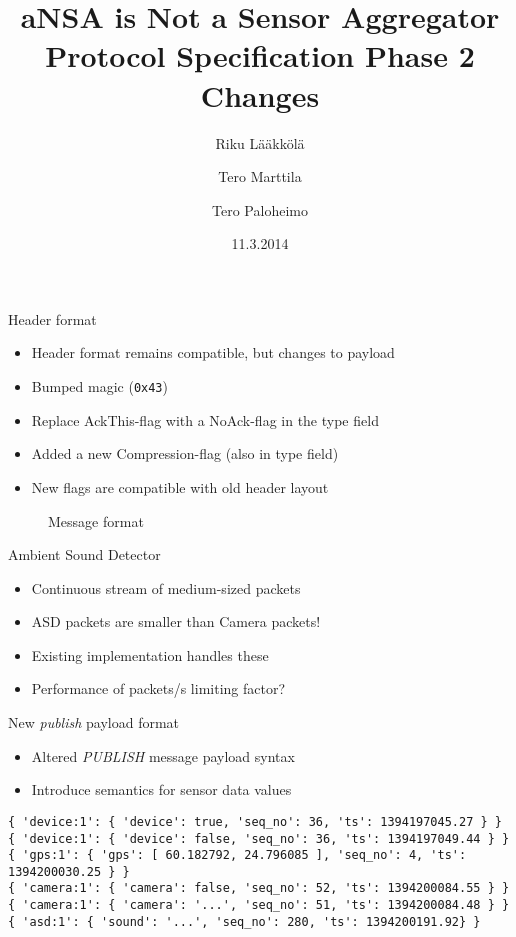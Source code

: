\documentclass{beamer}
\title[SFO protocol]{aNSA is Not a Sensor Aggregator\\Protocol Specification Phase 2 Changes}
\author{Riku Lääkkölä \and Tero Marttila \and Tero Paloheimo}
\institute{Aalto ELEC}
\date{11.3.2014}
\begin{document}
\begin{frame}
\titlepage
\end{frame}

\begin{frame}{Header format}
\begin{itemize}
	\item Header format remains compatible, but changes to payload
	\item Bumped magic (\texttt{0x43})
	\item Replace AckThis-flag with a NoAck-flag in the type field
	\item Added a new Compression-flag (also in type field)
	\item New flags are compatible with old header layout
\end{itemize}

\begin{figure}
    \begin{center}
        {\tiny }
        \caption{Message format}
        \label{fig:header}
    \end{center}
\end{figure}

\end{frame}

\begin{frame}{Ambient Sound Detector}
\begin{itemize}
	\item Continuous stream of medium-sized packets
	\item ASD packets are smaller than Camera packets!
	\item Existing implementation handles these
	\item Performance of packets/s limiting factor?
\end{itemize}
\end{frame}

\begin{frame}[fragile]{New \emph{publish} payload format}
\begin{itemize}
	\item Altered \emph{PUBLISH} message payload syntax
	\item Introduce semantics for sensor data values
\end{itemize}
\footnotesize
\begin{verbatim}
{ 'device:1': { 'device': true, 'seq_no': 36, 'ts': 1394197045.27 } }
{ 'device:1': { 'device': false, 'seq_no': 36, 'ts': 1394197049.44 } }
{ 'gps:1': { 'gps': [ 60.182792, 24.796085 ], 'seq_no': 4, 'ts': 1394200030.25 } }
{ 'camera:1': { 'camera': false, 'seq_no': 52, 'ts': 1394200084.55 } }
{ 'camera:1': { 'camera': '...', 'seq_no': 51, 'ts': 1394200084.48 } }
{ 'asd:1': { 'sound': '...', 'seq_no': 280, 'ts': 1394200191.92} }
\end{verbatim}
\end{frame}
\end{document}
